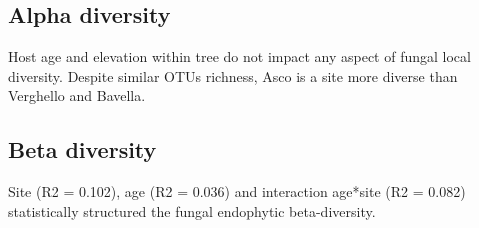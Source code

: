 \documentclass[12pt]{article}\usepackage[]{graphicx}\usepackage[]{color}
\numberwithin{figure}{section}
\begin{document}
  \subsection{Alpha diversity}

Host age and elevation within tree do not impact any aspect of fungal local diversity. Despite similar OTUs richness, Asco is a site more diverse than Verghello and Bavella.

  \subsection{Beta diversity}

Site (R2 = 0.102), age (R2 = 0.036) and interaction age*site (R2 = 0.082) statistically structured the fungal endophytic beta-diversity. 


\cleardoublepage
\listoffigures
\listoftables
\end{document}
